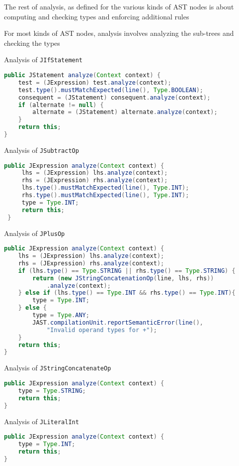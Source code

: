 \documentclass[8pt,a4paper,compress]{beamer}
\begin{document}
\begin{frame}[fragile]
\pause

The rest of analysis, as defined for the various kinds of AST nodes is about computing and checking types and enforcing additional \jmm rules

\pause
\bigskip

For most kinds of AST nodes, analysis involves analyzing the sub-trees and checking the types

\pause
\bigskip

Analysis of \lstinline{JIfStatement}
\begin{lstlisting}[language=Java]
public JStatement analyze(Context context) {
    test = (JExpression) test.analyze(context);
    test.type().mustMatchExpected(line(), Type.BOOLEAN);
    consequent = (JStatement) consequent.analyze(context);
    if (alternate != null) {
        alternate = (JStatement) alternate.analyze(context);
    }
    return this;
}
\end{lstlisting}

\pause
\bigskip

Analysis of \lstinline{JSubtractOp}
\begin{lstlisting}[language=Java]
public JExpression analyze(Context context) {
     lhs = (JExpression) lhs.analyze(context);
     rhs = (JExpression) rhs.analyze(context);
     lhs.type().mustMatchExpected(line(), Type.INT);
     rhs.type().mustMatchExpected(line(), Type.INT);
     type = Type.INT;
     return this;
 }
\end{lstlisting}
\end{frame}

\begin{frame}[fragile]
\pause

Analysis of \lstinline{JPlusOp}
\begin{lstlisting}[language=Java]
public JExpression analyze(Context context) {
    lhs = (JExpression) lhs.analyze(context);
    rhs = (JExpression) rhs.analyze(context);
    if (lhs.type() == Type.STRING || rhs.type() == Type.STRING) {
        return (new JStringConcatenationOp(line, lhs, rhs))
            .analyze(context);
    } else if (lhs.type() == Type.INT && rhs.type() == Type.INT){
        type = Type.INT;
    } else {
        type = Type.ANY;
        JAST.compilationUnit.reportSemanticError(line(),
            "Invalid operand types for +");
    }
    return this;
}
\end{lstlisting}

\pause
\bigskip

Analysis of \lstinline{JStringConcatenateOp}
\begin{lstlisting}[language=Java]
public JExpression analyze(Context context) {
    type = Type.STRING;
    return this;
}
\end{lstlisting}

\pause
\bigskip

Analysis of \lstinline{JLiteralInt}
\begin{lstlisting}[language=Java]
public JExpression analyze(Context context) {
    type = Type.INT;
    return this;
}
\end{lstlisting}
\end{frame}
\end{document}
